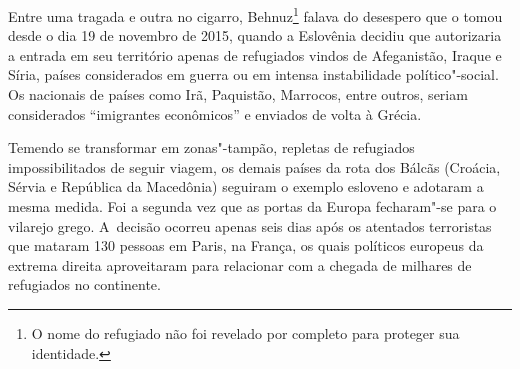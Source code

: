 \putodd{}
\clearpage


 

Entre uma tragada e outra no cigarro, Behnuz\footnote{ O nome do refugiado não foi revelado por completo
para proteger sua identidade.} falava do
desespero que o tomou desde o dia 19 de novembro de 2015, quando a
Eslovênia decidiu que autorizaria a entrada em seu território apenas de
refugiados vindos de Afeganistão, Iraque e Síria, países considerados em
guerra ou em intensa instabilidade político"-social. Os nacionais de
países como Irã, Paquistão, Marrocos, entre outros, seriam considerados
``imigrantes econômicos'' e enviados de volta à Grécia.

Temendo se transformar em zonas"-tampão, repletas de refugiados
impossibilitados de seguir viagem, os demais países da rota dos Bálcãs
(Croácia, Sérvia e República da Macedônia) seguiram o exemplo esloveno e
adotaram a mesma medida. Foi a segunda vez que as portas da Europa
fecharam"-se para o vilarejo grego. A~decisão ocorreu apenas seis dias
após os atentados terroristas que mataram 130 pessoas em Paris, na
França, os quais políticos europeus da extrema direita aproveitaram para
relacionar com a chegada de milhares de refugiados no continente.

